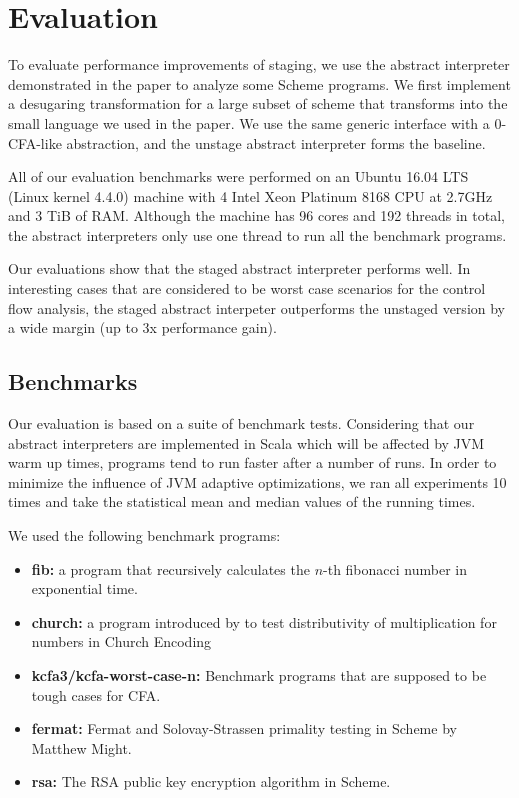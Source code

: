 \section{Evaluation} \label{evaluation}

To evaluate performance improvements of staging, we use the abstract interpreter
demonstrated in the paper to analyze some Scheme programs. We first implement
a desugaring transformation for a large subset of scheme that transforms into the
small language we used in the paper.
We use the same generic interface with a 0-CFA-like abstraction, and the unstage abstract
interpreter forms the baseline.

All of our evaluation benchmarks were performed on an Ubuntu 16.04 LTS (Linux kernel 4.4.0)
machine with 4 Intel Xeon Platinum 8168 CPU at 2.7GHz and 3 TiB of RAM.
Although the machine has 96 cores and 192 threads in total,
the abstract interpreters only use one thread to run all the benchmark programs.

Our evaluations show that the staged abstract interpreter performs well. In interesting
cases that are considered to be worst case scenarios for the control flow
analysis, the staged abstract interpeter outperforms the unstaged version by a wide
margin (up to 3x performance gain).

\subsection{Benchmarks}

Our evaluation is based on a suite of benchmark tests. Considering that our abstract
interpreters are implemented in Scala which will be affected by JVM warm up times, programs
tend to run faster after a number of runs. In order to minimize the influence of JVM adaptive optimizations,
we ran all experiments 10 times and take the statistical mean and median values of
the running times.

We used the following benchmark programs:
\begin{itemize}
    \item \textbf{fib:} a program that recursively calculates the $n$-th fibonacci number in
        exponential time.
    \item \textbf{church:} a program introduced by  to test distributivity of multiplication for numbers in Church Encoding 
    \item \textbf{kcfa3/kcfa-worst-case-n:} Benchmark programs that are supposed to
      be tough cases for CFA.
    \item \textbf{fermat:} Fermat and Solovay-Strassen primality testing in Scheme by
      Matthew Might.
    \item \textbf{rsa:} The RSA public key encryption algorithm in Scheme.
\end{itemize}

